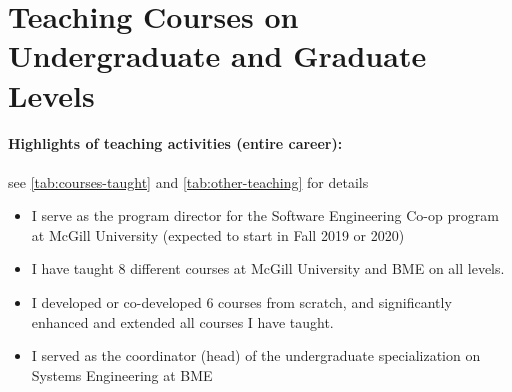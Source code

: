\section{Teaching Courses on Undergraduate and Graduate Levels}

\paragraph{Highlights of teaching activities (entire career):} see \autoref{tab:courses-taught} and \autoref{tab:other-teaching} for details
\begin{itemize}[leftmargin=0.5cm]
\item  
I serve as the program director for the Software Engineering Co-op program at McGill University (expected to start in Fall 2019 or 2020) 
\item I have taught 8 different courses at McGill University and BME on all levels. 
\item I developed or co-developed 6 courses from scratch, and significantly enhanced and extended all courses I have taught. 
\item I served as the coordinator (head) of the undergraduate specialization on Systems Engineering at BME
\end{itemize}

